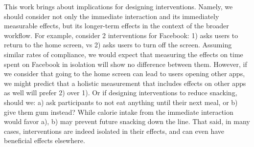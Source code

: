 This work brings about implications for designing interventions. Namely, we should consider not only the immediate interaction and its immediately measurable effects, but its longer-term effects in the context of the broader workflow. For example, consider 2 interventions for Facebook: 1) asks users to return to the home screen, vs 2) asks users to turn off the screen. Assuming similar rates of compliance, we would expect that measuring the effects on time spent on Facebook in isolation will show no difference between them. However, if we consider that going to the home screen can lead to users opening other apps, we might predict that a holistic measurement that includes effects on other apps as well will prefer 2) over 1).
Or if designing interventions to reduce snacking, should we: a) ask participants to not eat anything until their next meal, or b) give them gum instead? While calorie intake from the immediate interaction would favor a), b) may prevent future snacking down the line.
That said, in many cases, interventions are indeed isolated in their effects, and can even have beneficial effects elsewhere. %





